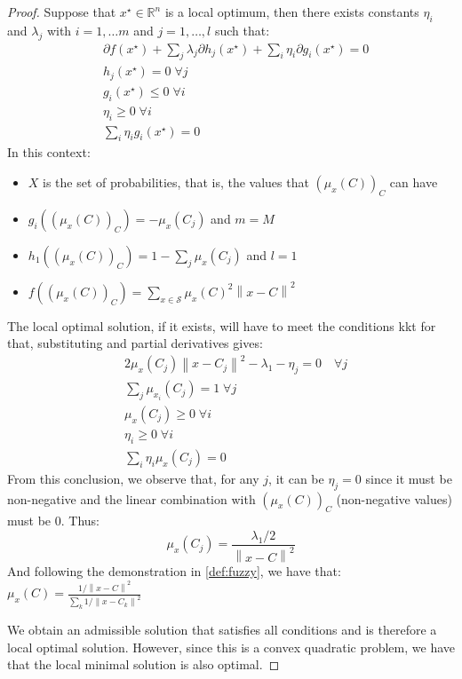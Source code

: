 \begin{remark}
\begin{toReview}
\begin{proof}
		\noindent Suppose that $x^\star\in\mathbb{R}^n$ is a local optimum, then there exists constants $\eta_i$ and $\lambda_j$ with $i=1,\ldots m$ and $j=1,\ldots,l$ such that:
		\begin{align*}
			&\partial f(x^\star) + \sum_j \lambda_j \partial h_j(x^\star) + \sum_i \eta_i \partial g_i(x^\star) = 0\\
			&h_j(x^\star)=0 \; \forall j\\
			&g_i(x^\star)\leq0 \; \forall i\\
			&\eta_i \geq 0\;\forall i \\
			&\sum_i \eta_i g_i(x^\star) = 0
		\end{align*}
		\upshape
		In this context:
		\begin{itemize}
			\item $X$ is the set of probabilities, that is, the values that $\left(\mu_x(C)\right)_C$ can have
			\item $g_i(\left(\mu_x(C)\right)_C) = -\mu_x(C_j)$ and $m=M$
			\item $h_1(\left(\mu_x(C)\right)_C) = 1 - \sum_j \mu_{x}(C_j)$ and $l=1$
			\item $f(\left(\mu_x(C)\right)_C) = \sum_{x \in \mathcal{S}}\mu_x(C)^2\left\|x-C\right\|^2$
		\end{itemize}
		The local optimal solution, if it exists, will have to meet the conditions \gls{kkt} for that, substituting and partial derivatives gives:
		\begin{align*}
			&2\mu_x(C_j)\left\|x-C_j\right\|^2 - \lambda_1 - \eta_j = 0 \quad \forall j\\
			&\sum_j \mu_{x_i}(C_j)=1 \; \forall j\\
			&\mu_x(C_j)\geq0 \; \forall i\\
			&\eta_i \geq 0\;\forall i \\
			&\sum_i \eta_i \mu_x(C_j) = 0
		\end{align*}
		From this conclusion, we observe that, for any $j$, it can be $\eta_j=0$ since it must be non-negative and the linear combination with $\left(\mu_x(C)\right)_C$ (non-negative values) must be $0$. Thus:
		$$\mu_x(C_j) = \frac{\lambda_1/2}{\left\|x-C\right\|^2}$$
		And following the demonstration in \cref{def:fuzzy}, we have that:\\
		$\mu_x(C) = \frac{1/\left\|x-C\right\|^2}{\sum_k 1/\left\|x-C_k\right\|^2}$

		\bigskip \noindent We obtain an admissible solution that satisfies all conditions and is therefore a local optimal solution. However, since this is a convex quadratic problem, we have that the local minimal solution is also optimal.
	\end{proof}
	\end{toReview}


\end{remark}
